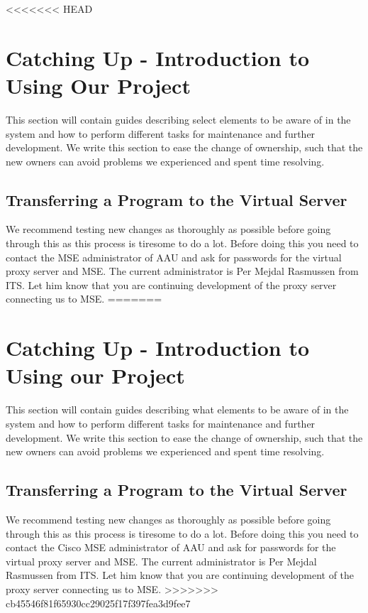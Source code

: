 <<<<<<< HEAD
\section{Catching Up - Introduction to Using Our Project}\label{sec:catchup}
This section will contain guides describing select elements to be aware of in the system and how to perform different tasks for maintenance and further development. We write this section to ease the change of ownership, such that the new owners can avoid problems we experienced and spent time resolving. 

\subsection*{Transferring a Program to the Virtual Server}
We recommend testing new changes as thoroughly as possible before going through this as this process is tiresome to do a lot. Before doing this you need to contact the MSE administrator of AAU and ask for passwords for the virtual proxy server and MSE. The current administrator is Per Mejdal Rasmussen from ITS. Let him know that you are continuing development of the proxy server connecting us to MSE.
=======
\section{Catching Up - Introduction to Using our Project}\label{sec:catchup}
This section will contain guides describing what elements to be aware of in the system and how to perform different tasks for maintenance and further development. We write this section to ease the change of ownership, such that the new owners can avoid problems we experienced and spent time resolving. 

\subsection{Transferring a Program to the Virtual Server}
We recommend testing new changes as thoroughly as possible before going through this as this process is tiresome to do a lot. Before doing this you need to contact the Cisco MSE administrator of AAU and ask for passwords for the virtual proxy server and MSE. The current administrator is Per Mejdal Rasmussen from ITS. Let him know that you are continuing development of the proxy server connecting us to MSE.
>>>>>>> cb45546f81f65930cc29025f17f397fea3d9fee7

